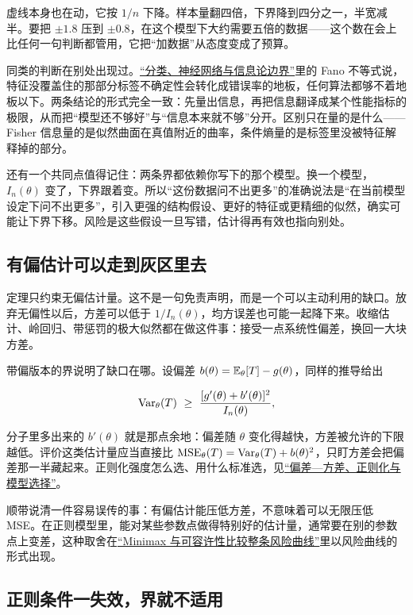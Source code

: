虚线本身也在动，它按 \(1/n\) 下降。样本量翻四倍，下界降到四分之一，半宽减半。要把 \(\pm1.8\) 压到 \(\pm0.8\)，在这个模型下大约需要五倍的数据——这个数在会上比任何一句判断都管用，它把``加数据''从态度变成了预算。

同类的判断在别处出现过。\hyperref[sec:07-Information-Theory/06-Information-and-Learning/04]{``分类、神经网络与信息论边界''}里的 Fano 不等式说，特征没覆盖住的那部分标签不确定性会转化成错误率的地板，任何算法都够不着地板以下。两条结论的形式完全一致：先量出信息，再把信息翻译成某个性能指标的极限，从而把``模型还不够好''与``信息本来就不够''分开。区别只在量的是什么——Fisher 信息量的是似然曲面在真值附近的曲率，条件熵量的是标签里没被特征解释掉的部分。

还有一个共同点值得记住：两条界都依赖你写下的那个模型。换一个模型，\(I_n(\theta)\) 变了，下界跟着变。所以``这份数据问不出更多''的准确说法是``在当前模型设定下问不出更多''，引入更强的结构假设、更好的特征或更精细的似然，确实可能让下界下移。风险是这些假设一旦写错，估计得再有效也指向别处。

\subsection{有偏估计可以走到灰区里去}

定理只约束无偏估计量。这不是一句免责声明，而是一个可以主动利用的缺口。放弃无偏性以后，方差可以低于 \(1/I_n(\theta)\)，均方误差也可能一起降下来。收缩估计、岭回归、带惩罚的极大似然都在做这件事：接受一点系统性偏差，换回一大块方差。

带偏版本的界说明了缺口在哪。设偏差 \(b(\theta)=\mathbb{E}_\theta[T]-g(\theta)\)，同样的推导给出

\[
\Var_\theta(T)\ \ge\ \frac{[g'(\theta)+b'(\theta)]^2}{I_n(\theta)},
\]

分子里多出来的 \(b'(\theta)\) 就是那点余地：偏差随 \(\theta\) 变化得越快，方差被允许的下限越低。评价这类估计量应当直接比 \(\operatorname{MSE}_\theta(T)=\operatorname{Var}_\theta(T)+b(\theta)^2\)，只盯方差会把偏差那一半藏起来。正则化强度怎么选、用什么标准选，见\hyperref[sec:11-Mathematical-Statistics/06-Resampling-and-Model-Selection/04]{``偏差---方差、正则化与模型选择''}。

顺带说清一件容易误传的事：有偏估计能压低方差，不意味着可以无限压低 MSE。在正则模型里，能对某些参数点做得特别好的估计量，通常要在别的参数点上变差，这种取舍在\hyperref[sec:11-Mathematical-Statistics/07-Statistical-Decision-and-Reliable-Prediction/03]{``Minimax 与可容许性比较整条风险曲线''}里以风险曲线的形式出现。

\subsection{正则条件一失效，界就不适用}

